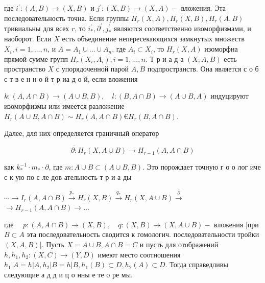 \documentclass[10pt]{article}
\begin{document}
где $i^{\prime}:(A, B) \rightarrow(X, B)$ и $j^{\prime}:(X, B) \rightarrow(X, A)-$ вложения. Эта последовательность точна. Если группы $H_{r}(X, A), H_{r}(X, B), H_{r}(A, B)$ тривиальны для всех $r$, то $i_{*}^{\prime}, \partial^{\prime}, j_{*}^{\prime}$ являются соответственно изоморфизмами, и наоборот. Если $X$ есть объединение непересекающихся замкнутых множеств $X_{i}, i=1, \ldots, n$, и $A=A_{1} \cup \ldots \cup A_{n}$, где $A_{i} \subset X_{i}$, то $H_{r}(X, A)$ изоморфна прямой сумме групп $H_{r}\left(X_{i}, A_{i}\right), i=1, \ldots, n$. Т р и а д а $(X ; A, B)$ есть пространство $X$ с упорядоченной парой $A, B$ подпространств. Она является с о б с т в е н н о й т р иа д о й, если вложения



$k:(A, A \cap B) \longrightarrow(A \cup B, B), \quad l:(B, A \cap B) \longrightarrow(A \cup B, A)$ индуцируют изоморфизмы или имеется разложение $H_{r}(A \cup B, A \cap B) \sim H_{r}(A, A \cap B) € H_{r}(B, A \cap B)$.



Далее, для них определяется граничный оператор



\[

\overline{\partial:} H_{r}(X, A \cup B) \longrightarrow H_{r-1}(A, A \cap B)

\]



как $k_{*}^{-1} \cdot m_{*} \cdot \partial$, где $m: A \cup B \subset(A \cup B, B)$. Это порождает точную г о о лог иче с к ую по с ле дов ательность т р и а ды



$\cdots \longrightarrow I_{r}(A, A \cap B) \stackrel{p_{*}}{\longrightarrow} H_{r}(X, B) \stackrel{q_{*}}{\longrightarrow} H_{r}(X, A \cup B) \stackrel{\bar{\partial}}{\longrightarrow}$ $\longrightarrow H_{r-1}(A, A \cap B) \longrightarrow \ldots$



где $\quad p:(A, A \cap B) \rightarrow(X, B), \quad q:(X, B) \rightarrow(X, A \cup B)-$ вложения [при $B \subset A$ эта последовательность сводится к гомологич. последовательности тройки $(X, A, B)]$. Пусть $X=A \cup B, A \cap B=C$ и пусть для отображений $h, h_{1}, h_{2}:(X, C) \rightarrow(Y, D)$ имеют место соотношения $h_{1}|A=h| A, h_{2}|B=h| B, h_{1}(B) \subset D, h_{2}(A) \subset D$. Тогда справедливы следующие а д д и ц о нны е те о ре мы.
\end{document}
